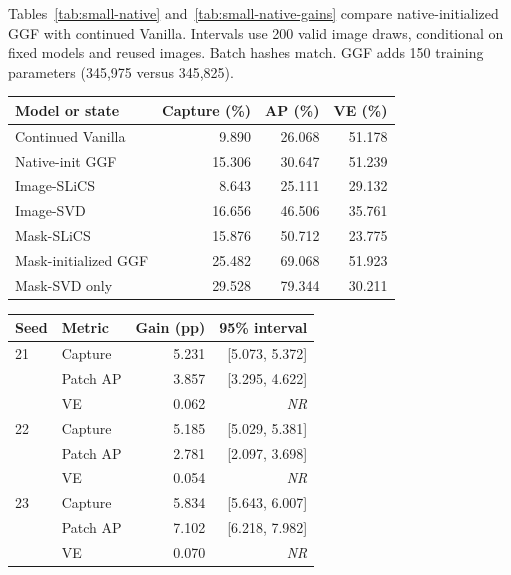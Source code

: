 Tables~\ref{tab:small-native} and~\ref{tab:small-native-gains} compare
native-initialized GGF with continued Vanilla. Intervals use 200 valid
image draws, conditional on fixed models and reused images. Batch hashes
match. GGF adds 150 training parameters (345,975 versus 345,825).
\begin{agfresulttable}
\caption{Mean scores in the earlier 75-group comparisons. Capture, patch AP and VE are percentages. Native-initialized GGF, image-derived controls and mask-initialized models are separate experimental arms on the reused test.}\label{tab:small-native}\label{tab:image-controls}\label{tab:mask-comparison}\label{tab:mask-mean-gains}
\begin{tabular}{@{}lrrr@{}}
\toprule
Model or state & Capture (\%) & AP (\%) & VE (\%) \\
\midrule
Continued Vanilla & 9.890 & 26.068 & 51.178 \\
Native-init GGF & 15.306 & 30.647 & 51.239 \\
Image-SLiCS & 8.643 & 25.111 & 29.132 \\
Image-SVD & 16.656 & 46.506 & 35.761 \\
Mask-SLiCS & 15.876 & 50.712 & 23.775 \\
Mask-initialized GGF & 25.482 & 69.068 & 51.923 \\
Mask-SVD only & 29.528 & 79.344 & 30.211 \\
\bottomrule
\end{tabular}

\end{agfresulttable}
\begin{agfresulttable}
\caption{Native-init GGF minus continued Vanilla, percentage points. NR: interval not reported.}\label{tab:small-native-gains}\label{fig:smallcapacity-gains}
\begin{tabular}{@{}llrr@{}}
\toprule
Seed & Metric & Gain (pp) & 95\% interval \\
\midrule
21 & Capture & 5.231 & [5.073, 5.372] \\
 & Patch AP & 3.857 & [3.295, 4.622] \\
 & VE & 0.062 & \textit{NR} \\
22 & Capture & 5.185 & [5.029, 5.381] \\
 & Patch AP & 2.781 & [2.097, 3.698] \\
 & VE & 0.054 & \textit{NR} \\
23 & Capture & 5.834 & [5.643, 6.007] \\
 & Patch AP & 7.102 & [6.218, 7.982] \\
 & VE & 0.070 & \textit{NR} \\
\bottomrule
\end{tabular}

\end{agfresulttable}

